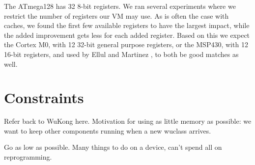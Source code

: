 The ATmega128 has 32 8-bit registers. We ran several experiments where we restrict the number of registers our VM may use. As is often the case with caches, we found the first few available registers to have the largest impact, while the added improvement gets less for each added register. Based on this we expect the Cortex M0, with 12 32-bit general purpose registers, or the MSP430, with 12 16-bit registers, and used by Ellul and Martinez \cite{Ellul:2010iw}, to both be good matches as well.

\section{Constraints}

Refer back to WuKong here. Motivation for using as little memory as possible: we want to keep other components running when a new wuclass arrives.

Go as low as possible. Many things to do on a device, can't spend all on reprogramming.









